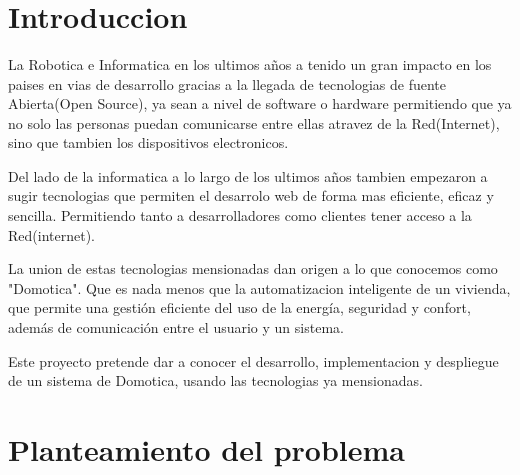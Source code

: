 \documentclass[letterpaper,12pt]{article}
\begin{document}
{\begin{center}
\begin{minipage}[b]{5cm}
	\end{minipage}\\
	[4cm]

	{\fontsize{12}{3}\selectfont{Cochabamba, 2018}}\\[1cm]
\end{center}



\vspace{1cm}
\ %



\tableofcontents
\newpage



\section{Introduccion}
\vspace{1cm}

La Robotica e Informatica en los ultimos años a tenido un gran impacto en los paises en vias de desarrollo gracias a la llegada de tecnologias de fuente Abierta(Open Source), ya sean a nivel de software o hardware  permitiendo que ya no solo las personas  puedan comunicarse entre ellas atravez de la Red(Internet), sino que tambien los dispositivos electronicos.

Del lado de la informatica a lo largo de los ultimos años tambien  empezaron a sugir tecnologias que permiten el desarrolo web de forma mas eficiente, eficaz y sencilla. Permitiendo tanto a desarrolladores como clientes tener acceso  a la Red(internet).


La union de estas tecnologias mensionadas dan origen a lo que conocemos como "Domotica". Que es nada menos que la automatizacion inteligente de un vivienda, que permite una gestión eficiente del uso de la energía, seguridad y confort, además de comunicación entre el usuario y un sistema. 

Este proyecto pretende dar a conocer el desarrollo, implementacion  y despliegue de un sistema de Domotica, usando las tecnologias ya mensionadas.


\section{Planteamiento del problema}
}
\end{document}
